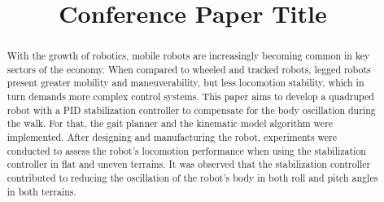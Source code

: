 \documentclass[conference]{IEEEtran}
\begin{document}
\title{Conference Paper Title\\
}

\author{
  \and
  \and
}

\maketitle

\begin{abstract}
  With the growth of robotics, mobile robots are increasingly becoming common in key sectors of the economy. When compared to wheeled and tracked robots, legged robots present greater mobility and maneuverability, but less locomotion stability, which in turn demands more complex control systems. This paper aims to develop a quadruped robot with a PID  stabilization controller to compensate for the body oscillation during the walk. For that, the gait planner and the kinematic model algorithm were implemented. After designing and manufacturing the robot, experiments were conducted to assess the robot's locomotion performance when using the stabilization controller in flat and uneven terrains. It was observed that the stabilization controller contributed to reducing the oscillation of the robot's body in both roll and pitch angles in both terrains.
\end{abstract}
\end{document}
